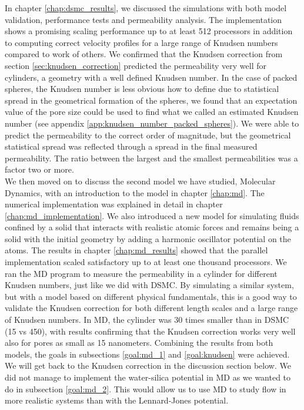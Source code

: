 In chapter \ref{chap:dsmc_results}, we discussed the simulations with both model validation, performance tests and permeability analysis. The implementation shows a promising scaling performance up to at least 512 processors in addition to computing correct velocity profiles for a large range of Knudsen numbers compared to work of others. We confirmed that the Knudsen correction from section \ref{sec:knudsen_correction} predicted the permeability very well for cylinders, a geometry with a well defined Knudsen number. In the case of packed spheres, the Knudsen number is less obvious how to define due to statistical spread in the geometrical formation of the spheres, we found that an expectation value of the pore size could be used to find what we called an estimated Knudsen number (see appendix \ref{app:knudsen_number_packed_spheres}). We were able to predict the permeability to the correct order of magnitude, but the geometrical statistical spread was reflected through a spread in the final measured permeability. The ratio between the largest and the smallest permeabilities was a factor two or more.\\
We then moved on to discuss the second model we have studied, Molecular Dynamics, with an introduction to the model in chapter \ref{chap:md}. The numerical implementation was explained in detail in chapter \ref{chap:md_implementation}. We also introduced a new model for simulating fluids confined by a solid that interacts with realistic atomic forces and remains being a solid with the initial geometry by adding a harmonic oscillator potential on the atoms. The results in chapter \ref{chap:md_results} showed that the parallel implementation scaled satisfactory up to at least one thousand processors. We ran the MD program to measure the permeability in a cylinder for different Knudsen numbers, just like we did with DSMC. By simulating a similar system, but with a model based on different physical fundamentals, this is a good way to validate the Knudsen correction for both different length scales and a large range of Knudsen numbers. In MD, the cylinder was 30 times smaller than in DSMC (\unit{15}{\nano\meter} vs \unit{450}{\nano\meter}), with results confirming that the Knudsen correction works very well also for pores as small as 15 nanometers. Combining the results from both models, the goals in subsections \ref{goal:md_1} and \ref{goal:knudsen} were achieved. We will get back to the Knudsen correction in the discussion section below. We did not manage to implement the water-silica potential in MD as we wanted to do in subsection \ref{goal:md_2}. This would allow us to use MD to study flow in more realistic systems than with the Lennard-Jones potential. 
